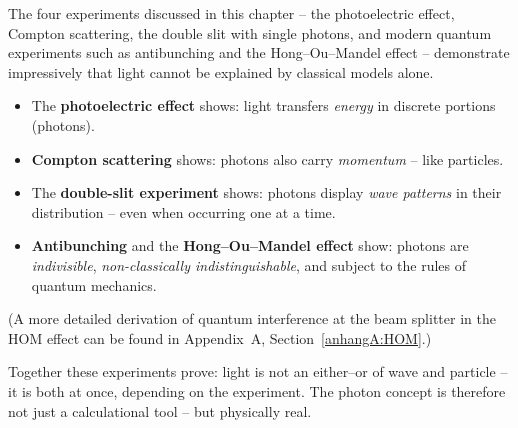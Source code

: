 \begin{tcolorbox}[hinweisbox, title=What the Experiments Show About Light]
	\label{box:was die Experimente}
	\small
	The four experiments discussed in this chapter – the photoelectric effect, Compton scattering, the double slit with single photons, and modern quantum experiments such as antibunching and the Hong–Ou–Mandel effect – demonstrate impressively that light cannot be explained by classical models alone.
	
	\begin{itemize}
		\item The \textbf{photoelectric effect} shows: light transfers \emph{energy} in discrete portions (photons).
		\item \textbf{Compton scattering} shows: photons also carry \emph{momentum} – like particles.
		\item The \textbf{double-slit experiment} shows: photons display \emph{wave patterns} in their distribution – even when occurring one at a time.
		\item \textbf{Antibunching} and the \textbf{Hong–Ou–Mandel effect} show: photons are \emph{indivisible}, \emph{non-classically indistinguishable}, and subject to the rules of quantum mechanics.
	\end{itemize}
	
	(A more detailed derivation of quantum interference at the beam splitter in the HOM effect can be found in Appendix~A, Section~\ref{anhangA:HOM}.) 
	
	Together these experiments prove: light is not an either–or of wave and particle – it is both at once, depending on the experiment. The photon concept is therefore not just a calculational tool – but physically real.
\end{tcolorbox}
